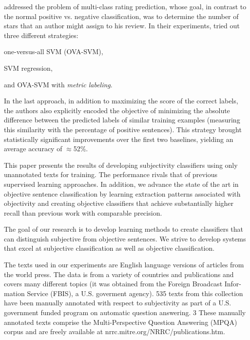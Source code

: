 
\citet{Pang:05} addressed the problem of multi-class rating
prediction, whose goal, in contrast to the normal positive
vs. negative classification, was to determine the number of stars that
an author might assign to his review.  In their experiments,
\citeauthor{Pang:05} tried out three different strategies:
\begin{inparaenum}[(i)]
  \item one-versus-all SVM (OVA-SVM),
  \item SVM regression,
  \item and OVA-SVM with \emph{metric labeling}.
\end{inparaenum}
In the last approach, in addition to maximizing the score of the
correct labels, the authors also explicitly encoded the objective of
minimizing the absolute difference between the predicted labels of
similar training examples (measuring this similarity with the
percentage of positive sentences).  This strategy brought
statistically significant improvements over the first two baselines,
yielding an average accuracy of $\approx$52\%.


This paper presents the results of developing subjectivity classifiers
using only unannotated texts for training. The performance rivals that
of previous supervised learning approaches. In addition, we advance
the state of the art in objective sentence classification by learning
extraction patterns associated with objectivity and creating objective
classifiers that achieve substantially higher recall than previous
work with comparable precision.

The goal of our research is to develop learning methods to create
classifiers that can distinguish subjective from objective
sentences. We strive to develop systems that excel at subjective
classification as well as objective classification.

The texts used in our experiments are English language versions of
articles from the world press. The data is from a variety of countries
and publications and covers many different topics (it was obtained
from the Foreign Broadcast Infor- mation Service (FBIS), a
U.S. goverment agency). 535 texts from this collection have been
manually annotated with respect to subjectivity as part of a U.S.
government funded program on automatic question answering. 3 These
manually annotated texts comprise the Multi-Perspective Question
Answering (MPQA) corpus and are freely available at
nrrc.mitre.org/NRRC/publications.htm.

